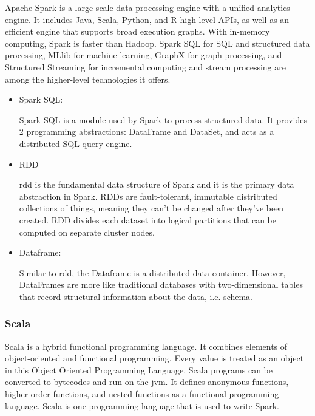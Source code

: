 Apache Spark is a large-scale data processing engine with a unified analytics engine. It includes Java, Scala, Python, and R high-level APIs, as well as an efficient engine that supports broad execution graphs. With in-memory computing, Spark is faster than Hadoop. Spark SQL for SQL and structured data processing, MLlib for machine learning, GraphX for graph processing, and Structured Streaming for incremental computing and stream processing are among the higher-level technologies it offers\cite{spark2018apache}.

\begin{itemize}
    \item Spark SQL: 
    
    Spark SQL is a module used by Spark to process structured data. It provides 2 programming abstractions: DataFrame and DataSet, and acts as a distributed SQL query engine\cite{10.1145/2723372.2742797}.
    
    \item RDD
    
    \ac{rdd} is the fundamental data structure of Spark and it is the primary data abstraction in Spark. RDDs are fault-tolerant, immutable distributed collections of things, meaning they can't be changed after they've been created. RDD divides each dataset into logical partitions that can be computed on separate cluster nodes\cite{rdd}.
    
    \item Dataframe: 
    
    Similar to \ac{rdd}, the Dataframe is a distributed data container. However, DataFrames are more like traditional databases with two-dimensional tables\cite{10.1145/2723372.2742797} that record structural information about the data, i.e. schema.
    
\end{itemize}

\subsubsection{Scala}
Scala is a hybrid functional programming language. It combines elements of object-oriented and functional programming. Every value is treated as an object in this Object Oriented Programming Language\cite{scala_documentation}. Scala programs can be converted to bytecodes and run on the \ac{jvm}. It defines anonymous functions, higher-order functions, and nested functions as a functional programming language\cite{geeksforgeeks_2021}. Scala is one programming language that is used to write Spark.


